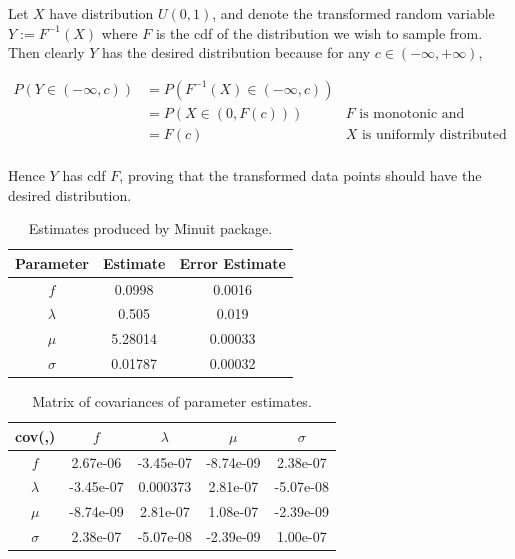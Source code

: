 \documentclass[12pt]{article}
\begin{document}
Let $X$ have distribution $U(0,1)$, and denote the transformed random variable $Y:=F^{-1}(X)$ where $F$ is the cdf of the distribution we wish to sample from.
Then clearly $Y$ has the desired distribution because for any $c\in(-\infty,+\infty)$,

\begin{align*}
    P(Y\in(-\infty, c)) & = P(F^{-1}(X)\in(-\infty, c)) \\
                        & = P(X\in(0, F(c))) & \text{$F$ is monotonic and increasing}\\
                        & = F(c) & \text{$X$ is uniformly distributed}\\
\end{align*}

Hence $Y$ has cdf $F$, proving that the transformed data points should have the desired distribution.

\begin{table}[htp]
  \centering
  \begin{tabular}{| c | c | c |}
      \hline
      Parameter & Estimate & Error Estimate \\
      \hline
      $f$  & 0.0998 & 0.0016 \\
      \hline
      $\lambda$ & 0.505 & 0.019 \\
      \hline
      $\mu$ & 5.28014 & 0.00033 \\
      \hline
      $\sigma$ & 0.01787 & 0.00032 \\
      \hline
  \end{tabular}
  \caption{Estimates produced by Minuit package.}
  \label{tab1}
  \end{table}

\begin{table}[htp]
    \centering
    \begin{tabular}{| c | c | c | c | c |}
        \hline
        cov(,) & $f$ & $\lambda$ & $\mu$ & $\sigma$ \\
        \hline
        $f$       & 2.67e-06  & -3.45e-07 & -8.74e-09 &  2.38e-07 \\
        \hline
        $\lambda$ & -3.45e-07 &  0.000373 &  2.81e-07 & -5.07e-08 \\
        \hline
        $\mu$     & -8.74e-09 &  2.81e-07 &  1.08e-07 & -2.39e-09 \\
        \hline
        $\sigma$  & 2.38e-07  & -5.07e-08 & -2.39e-09 &  1.00e-07 \\
        \hline
\end{tabular}
\caption{Matrix of covariances of parameter estimates.}
\label{tab2}
\end{table}
\end{document}
